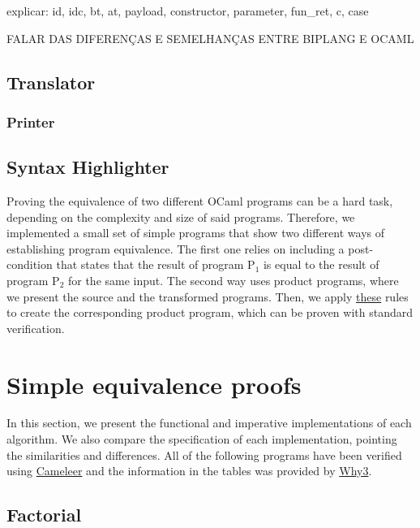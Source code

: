 explicar: id, idc, bt, at, payload, constructor, parameter, fun\_ret, c, case

FALAR DAS DIFERENÇAS E SEMELHANÇAS ENTRE BIPLANG E OCAML


\FloatBarrier
\subsection{Translator}
\label{subsec:translator}


\FloatBarrier
\subsubsection{Printer}
\label{subsubsec:printer}


\FloatBarrier
\subsection{Syntax Highlighter}
\label{subsec:syntax_highlighter}




\iffalse
Proving the equivalence of two different OCaml programs can be a hard task, depending on the complexity and size of said programs.
Therefore, we implemented a small set of simple programs that show two different ways of establishing program equivalence.
The first one relies on including a post-condition that states that the result of program P$_1$ is equal to the result of program P$_2$ for the same input.
The second way uses product programs, where we present the source and the transformed programs.
Then, we apply \hyperref[fig:product_construction_equal_struct]{these} rules to create the corresponding product program, which can be proven with standard verification.

\FloatBarrier
\section{Simple equivalence proofs}
\label{sec:results_eq_proofs}

In this section, we present the functional and imperative implementations of each algorithm.
We also compare the specification of each implementation, pointing the similarities and differences.
All of the following programs have been verified using \hyperref[sec:cameleer]{Cameleer} and the information in the tables was provided by \hyperref[sec:why3]{Why3}.


\subsection{Factorial}
\label{sub:factorial}

